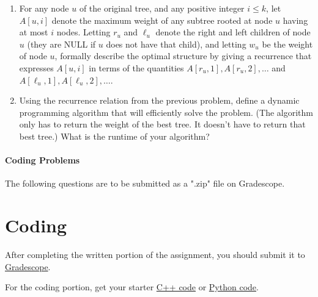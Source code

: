 \documentclass [12pt]{article}
\begin{document}
\begin{enumerate}
  \item {} For any node $u$ of the original tree, and any positive integer $i \le k$, let $A[u,i]$ denote the maximum weight of any subtree rooted at node $u$ having at most $i$ nodes. Letting $r_u$ and $\ell _u$ denote the right and left children of node $u$ (they are NULL if $u$ does not have that child), and letting $w_u$ be the weight of node $u$, formally describe the optimal structure by giving a recurrence that expresses $A[u,i]$ in terms of the quantities $A[r_u,1],A[r_u,2],\ldots $ and $A[\ell _u,1],A[\ell _u,2],\ldots $. 
  
  
  \item {} Using the recurrence relation from the previous problem, define a dynamic programming algorithm that will efficiently solve the problem. (The algorithm only has to return the weight of the best tree. It doesn't have to return that best tree.) What is the runtime of your algorithm? 

\end{enumerate}

\pagebreak
\begin{Instruction}

\paragraph{Coding Problems} The following questions are to be submitted as a ".zip" file on Gradescope. 

\end{Instruction}

\section{Coding }
After completing the written portion of the assignment, you should submit it to \href{https://www.gradescope.com/courses/350304}{Gradescope}.

For the coding portion, get your starter \href{https://replit.com/team/COMP285/HW7-Code}{C++ code} or \href{https://replit.com/team/COMP285/HW7-Code-Python}{Python code}.
\end{document}

